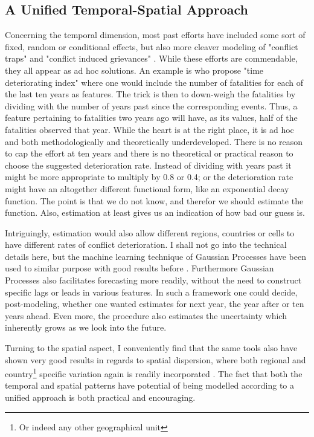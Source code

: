 \documentclass[a4paper]{article}
\begin{document}
\subsection{A Unified Temporal-Spatial Approach}

Concerning the temporal dimension, most past efforts have included some sort of fixed, random or conditional effects, but also more cleaver modeling of "conflict traps" and "conflict induced grievances" \citep{Collier_Hoeffler_2004, Hegre_Sambanis_2006, Cederman_Gleditsch_Buhaug_2013, perry_2013}. While these efforts are commendable, they all appear as ad hoc solutions. An example is \cite{perry_2013} who propose "time deteriorating index" where one would include the number of fatalities for each of the last ten years as features. The trick is then to down-weigh the fatalities by dividing with the number of years past since the corresponding events. Thus, a feature pertaining to fatalities two years ago will have, as its values, half of the fatalities observed that year\cite[14]{perry_2013}. While the heart is at the right place, it is ad hoc and both methodologically and theoretically underdeveloped. There is no reason to cap the effort at ten years and there is no theoretical or practical reason to choose the suggested deterioration rate. Instead of dividing with years past it might be more appropriate to multiply by 0.8 or 0.4; or the deterioration rate might have an altogether different functional form, like an exponential decay function. The point is that we do not know, and therefor we should estimate the function. Also, estimation at least gives us an indication of how bad our guess is.\par 

Intriguingly, estimation would also allow different regions, countries or cells to have different rates of conflict deterioration. I shall not go into the technical details here, but the machine learning technique of Gaussian Processes have been used to similar purpose with good results before \citep{Gelman_2013, Mcelreath_2018}. Furthermore Gaussian Processes also facilitates forecasting more readily, without the need to construct specific lags or leads in various features. In such a framework one could decide, post-modeling, whether one wanted estimates for next year, the year after or ten years ahead. Even more, the procedure also estimates the uncertainty which inherently grows as we look into the future.\par
 
Turning to the spatial aspect, I conveniently find that the same tools also have shown very good results in regards to spatial dispersion, where both regional and country\footnote{Or indeed any other geographical unit} specific variation again is readily incorporated \citep{gelfand2003spatial, gelfand2012hierarchical, gelfand2016spatial}. The fact that both the temporal and spatial patterns have potential of being modelled according to a unified approach is both practical and encouraging.\par
\end{document}
